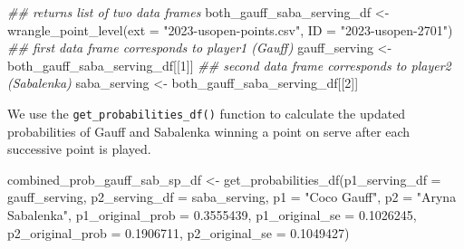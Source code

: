 \documentclass[
  letterpaper,
  DIV=11,
  numbers=noendperiod]{scrartcl}
\newenvironment{Shaded}{\begin{snugshade}}{\end{snugshade}}
\newcommand{\AttributeTok}[1]{\textcolor[rgb]{0.40,0.45,0.13}{#1}}
\newcommand{\DecValTok}[1]{\textcolor[rgb]{0.68,0.00,0.00}{#1}}
\newcommand{\DocumentationTok}[1]{\textcolor[rgb]{0.37,0.37,0.37}{\textit{#1}}}
\newcommand{\FloatTok}[1]{\textcolor[rgb]{0.68,0.00,0.00}{#1}}
\newcommand{\FunctionTok}[1]{\textcolor[rgb]{0.28,0.35,0.67}{#1}}
\newcommand{\NormalTok}[1]{\textcolor[rgb]{0.00,0.23,0.31}{#1}}
\newcommand{\OtherTok}[1]{\textcolor[rgb]{0.00,0.23,0.31}{#1}}
\newcommand{\StringTok}[1]{\textcolor[rgb]{0.13,0.47,0.30}{#1}}
\begin{document}
\linespread{0.9}

\begin{Shaded}
\begin{Highlighting}[]
\DocumentationTok{\#\# returns list of two data frames}
\NormalTok{both\_gauff\_saba\_serving\_df }\OtherTok{\textless{}{-}} \FunctionTok{wrangle\_point\_level}\NormalTok{(}\AttributeTok{ext =} \StringTok{"2023{-}usopen{-}points.csv"}\NormalTok{,}
                               \AttributeTok{ID =} \StringTok{"2023{-}usopen{-}2701"}\NormalTok{)}
\DocumentationTok{\#\# first data frame corresponds to player1 (Gauff)}
\NormalTok{gauff\_serving }\OtherTok{\textless{}{-}}\NormalTok{ both\_gauff\_saba\_serving\_df[[}\DecValTok{1}\NormalTok{]]}
\DocumentationTok{\#\# second data frame corresponds to player2 (Sabalenka)}
\NormalTok{saba\_serving }\OtherTok{\textless{}{-}}\NormalTok{ both\_gauff\_saba\_serving\_df[[}\DecValTok{2}\NormalTok{]]}
\end{Highlighting}
\end{Shaded}

\linespread{2}

We use the \texttt{get\_probabilities\_df()} function to calculate the
updated probabilities of Gauff and Sabalenka winning a point on serve
after each successive point is played.

\linespread{0.9}

\begin{Shaded}
\begin{Highlighting}[]
\NormalTok{combined\_prob\_gauff\_sab\_sp\_df }\OtherTok{\textless{}{-}} \FunctionTok{get\_probabilities\_df}\NormalTok{(}\AttributeTok{p1\_serving\_df =}\NormalTok{ gauff\_serving,}
                                 \AttributeTok{p2\_serving\_df =}\NormalTok{ saba\_serving,}
                                 \AttributeTok{p1 =} \StringTok{"Coco Gauff"}\NormalTok{,}
                                 \AttributeTok{p2 =} \StringTok{"Aryna Sabalenka"}\NormalTok{,}
                                 \AttributeTok{p1\_original\_prob =} \FloatTok{0.3555439}\NormalTok{,}
                                 \AttributeTok{p1\_original\_se =} \FloatTok{0.1026245}\NormalTok{,}
                                 \AttributeTok{p2\_original\_prob =} \FloatTok{0.1906711}\NormalTok{,}
                                 \AttributeTok{p2\_original\_se =} \FloatTok{0.1049427}\NormalTok{)}
\end{Highlighting}
\end{Shaded}

\linespread{2}
\end{document}
